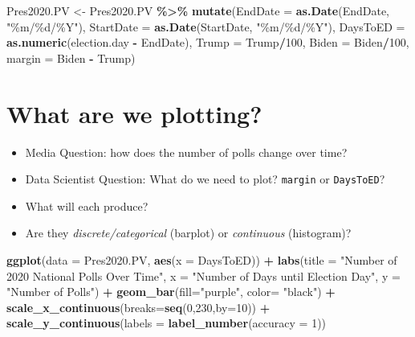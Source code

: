 \documentclass[
]{article}
\newenvironment{Shaded}{\begin{snugshade}}{\end{snugshade}}
\newcommand{\AttributeTok}[1]{\textcolor[rgb]{0.13,0.29,0.53}{#1}}
\newcommand{\DecValTok}[1]{\textcolor[rgb]{0.00,0.00,0.81}{#1}}
\newcommand{\FunctionTok}[1]{\textcolor[rgb]{0.13,0.29,0.53}{\textbf{#1}}}
\newcommand{\NormalTok}[1]{#1}
\newcommand{\OtherTok}[1]{\textcolor[rgb]{0.56,0.35,0.01}{#1}}
\newcommand{\SpecialCharTok}[1]{\textcolor[rgb]{0.81,0.36,0.00}{\textbf{#1}}}
\newcommand{\StringTok}[1]{\textcolor[rgb]{0.31,0.60,0.02}{#1}}
\begin{document}
\begin{Shaded}
\begin{Highlighting}[]
\NormalTok{Pres2020.PV }\OtherTok{\textless{}{-}}\NormalTok{ Pres2020.PV }\SpecialCharTok{\%\textgreater{}\%}
                \FunctionTok{mutate}\NormalTok{(}\AttributeTok{EndDate =} \FunctionTok{as.Date}\NormalTok{(EndDate, }\StringTok{"\%m/\%d/\%Y"}\NormalTok{), }
                      \AttributeTok{StartDate =} \FunctionTok{as.Date}\NormalTok{(StartDate, }\StringTok{"\%m/\%d/\%Y"}\NormalTok{),}
                      \AttributeTok{DaysToED =} \FunctionTok{as.numeric}\NormalTok{(election.day }\SpecialCharTok{{-}}\NormalTok{ EndDate),}
                      \AttributeTok{Trump =}\NormalTok{ Trump}\SpecialCharTok{/}\DecValTok{100}\NormalTok{,}
                      \AttributeTok{Biden =}\NormalTok{ Biden}\SpecialCharTok{/}\DecValTok{100}\NormalTok{,}
                      \AttributeTok{margin =}\NormalTok{ Biden }\SpecialCharTok{{-}}\NormalTok{ Trump)}
\end{Highlighting}
\end{Shaded}

\section{What are we plotting?}\label{what-are-we-plotting}

\begin{itemize}
\item
  Media Question: how does the number of polls change over time?
\item
  Data Scientist Question: What do we need to plot? \texttt{margin} or
  \texttt{DaysToED}?
\item
  What will each produce?
\item
  Are they \emph{discrete/categorical} (barplot) or \emph{continuous}
  (histogram)?
\end{itemize}

\begin{Shaded}
\begin{Highlighting}[]
\FunctionTok{ggplot}\NormalTok{(}\AttributeTok{data =}\NormalTok{ Pres2020.PV, }\FunctionTok{aes}\NormalTok{(}\AttributeTok{x =}\NormalTok{ DaysToED)) }\SpecialCharTok{+}
  \FunctionTok{labs}\NormalTok{(}\AttributeTok{title =} \StringTok{"Number of 2020 National Polls Over Time"}\NormalTok{,}
       \AttributeTok{x =} \StringTok{"Number of Days until Election Day"}\NormalTok{,}
       \AttributeTok{y =} \StringTok{"Number of Polls"}\NormalTok{) }\SpecialCharTok{+} 
  \FunctionTok{geom\_bar}\NormalTok{(}\AttributeTok{fill=}\StringTok{"purple"}\NormalTok{, }\AttributeTok{color=} \StringTok{"black"}\NormalTok{) }\SpecialCharTok{+}
  \FunctionTok{scale\_x\_continuous}\NormalTok{(}\AttributeTok{breaks=}\FunctionTok{seq}\NormalTok{(}\DecValTok{0}\NormalTok{,}\DecValTok{230}\NormalTok{,}\AttributeTok{by=}\DecValTok{10}\NormalTok{)) }\SpecialCharTok{+}
  \FunctionTok{scale\_y\_continuous}\NormalTok{(}\AttributeTok{labels =} \FunctionTok{label\_number}\NormalTok{(}\AttributeTok{accuracy =} \DecValTok{1}\NormalTok{))}
\end{Highlighting}
\end{Shaded}
\end{document}
